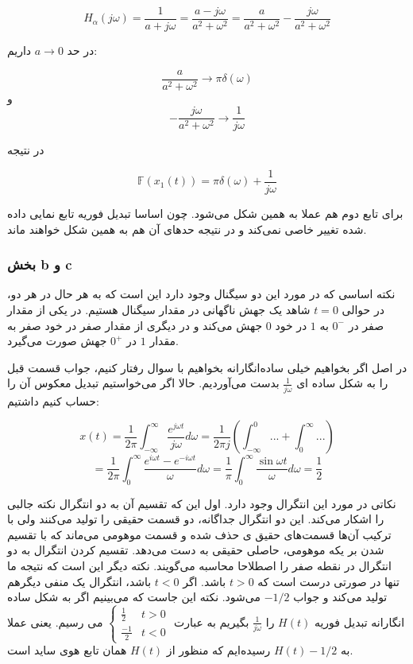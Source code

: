 \documentclass[12pt]{article}
\begin{document}
$$H_{\alpha}(j\omega) =
\frac{1}{a+j \omega}=\frac{a-j \omega}{a^{2}+\omega^{2}}=\frac{a}{a^{2}+\omega^{2}}-\frac{j \omega}{a^{2}+\omega^{2}}
$$

در حد $a \to 0$ داریم:

$$\frac{a}{a^2 + \omega^2} \to \pi \delta(\omega)$$
و
$$-\frac{j \omega}{a^2 +\omega^2} \to \frac{1}{j\omega}$$

در نتیجه

$$\mathbb{F}(x_1(t)) = \pi \delta(\omega) + \frac{1}{j\omega}$$

برای تابع دوم هم عملا به همین شکل می‌شود. چون اساسا تبدیل فوریه تابع نمایی داده شده تغییر خاصی نمی‌کند و در نتیجه حد‌های آن هم به همین شکل خواهند ماند.


\subsubsection{بخش b و c}

نکته اساسی که در مورد این دو سیگنال وجود دارد این است که به هر حال در هر دو، در حوالی $t=0$ شاهد یک جهش ناگهانی در مقدار سیگنال هستیم. در یکی از مقدار صفر در $0^{-}$ به $1$ در خود $0$ جهش می‌کند و در دیگری از مقدار صفر در خود صفر به مقدار $1$ در $0^+$ جهش صورت می‌گیرد.

در اصل اگر بخواهیم خیلی ساده‌انگارانه بخواهیم با سوال رفتار کنیم، جواب قسمت قبل را به شکل ساده ای
$\frac{1}{j\omega}$
بدست می‌آوردیم. حالا اگر می‌خواستیم تبدیل معکوس آن را حساب کنیم داشتیم:


$$x(t) = \frac{1}{2\pi} \int_{-\infty}^{\infty} \frac{e^{j\omega t}}{j\omega} d\omega = \frac{1}{2 \pi j} (\int_{-\infty}^{0} ... + \int_{0}^{\infty} ...)$$
$$
=\frac{1}{2 \pi } \int_{0}^{\infty} \frac{e^{i \omega t}-e^{-i \omega t}}{\omega} d \omega=\frac{1}{\pi} \int_{0}^{\infty} \frac{\sin \omega t}{\omega} d \omega=\frac{1}{2}
$$

نکاتی در مورد این انتگرال وجود دارد. اول این که تقسیم آن به دو انتگرال نکته جالبی را اشکار می‌کند. این دو انتگرال جداگانه، دو قسمت حقیقی را تولید می‌کنند ولی با  ترکیب آن‌ها قسمت‌های حقیق ی حذف شده و قسمت موهومی می‌ماند که با تقسیم شدن بر یکه موهومی، حاصلی حقیقی به دست می‌دهد. تقسیم کردن انتگرال به دو انتگرال در نقطه صفر را اصطلاحا محاسبه  می‌گویند. نکته دیگر این است که نتیجه ما تنها در صورتی درست است که $t>0$ باشد. اگر $t<0$ باشد، انتگرال یک منفی دیگر‌هم تولید می‌کند و جواب $-1/2$ می‌شود. نکته این جاست که می‌بینیم اگر به شکل ساده انگارانه تبدیل فوریه $H(t)$ را
$\frac{1}{j\omega}$
بگیریم به عبارت
$\left\{\begin{array}{ll}
	\frac{1}{2} & t > 0 \\
	\frac{-1}{2} & t<0
\end{array}\right.$
می رسیم. یعنی عملا به $H(t)-1/2$ رسیده‌ایم که منظور از $H(t)$ همان تابع هوی ساید است.
\end{document}
